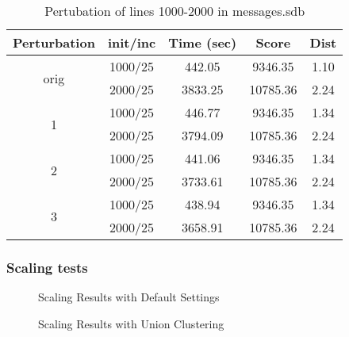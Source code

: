 \begin{table}[th]
\centering
\caption{Pertubation of lines 1000-2000 in messages.sdb}
\begin{tabular}{|c|c|c|c|c|} \hline 
Perturbation & init/inc & Time (sec) & Score & Dist \\ \hline 
 \multirow{2}{*}{orig}& 1000/25 & 442.05 & 9346.35 & 1.10 \\ \cline{2-5} 
& 2000/25 & 3833.25 & 10785.36 & 2.24 \\ \hline 
 \multirow{2}{*}{1}& 1000/25 & 446.77 & 9346.35 & 1.34 \\ \cline{2-5} 
& 2000/25 & 3794.09 & 10785.36 & 2.24 \\ \hline 
 \multirow{2}{*}{2}& 1000/25 & 441.06 & 9346.35 & 1.34 \\ \cline{2-5} 
& 2000/25 & 3733.61 & 10785.36 & 2.24 \\ \hline 
 \multirow{2}{*}{3} & 1000/25 & 438.94 & 9346.35 & 1.34 \\ \cline{2-5} 
& 2000/25 & 3658.91 & 10785.36 & 2.24 \\ \hline 
\end{tabular}
\end{table}

\subsubsection{Scaling tests}
\begin{figure}
\caption{Scaling Results with Default Settings}
\end{figure}

\begin{figure}
\caption{Scaling Results with Union Clustering}
\end{figure}

